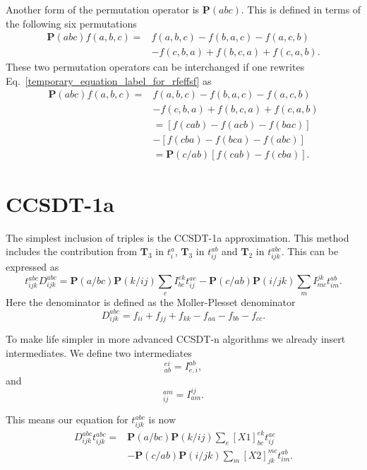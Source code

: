 Another form of the permutation operator is $\textbf{P}(abc)$. This is defined in terms of the following six permutations
\begin{align}
\textbf{P}(abc) f(a,b,c) = & f(a,b,c) - f(b,a,c) - f(a,c,b)  \nonumber \\ & - f(c,b,a) + f(b,c,a) + f(c,a,b) . \label{temporary_equation_label_for_rfeffsf}
\end{align}
These two permutation operators can be interchanged if one rewrites Eq.~\eqref{temporary_equation_label_for_rfeffsf} as
\begin{align}
\textbf{P}(abc) f(a,b,c) = & f(a,b,c) - f(b,a,c) - f(a,c,b)  \nonumber \\ & - f(c,b,a) + f(b,c,a) + f(c,a,b) \nonumber \\ &
= \left[ f(cab) - f(acb) - f(bac) \right] \nonumber \\ &
- \left[ f(cba) - f(bca) - f(abc) \right]
\nonumber \\ &
= \textbf{P}(c/ab) \left[ f(cab) - f(cba) \right] .
\end{align}

\section{CCSDT-1a}
The simplest inclusion of triples is the CCSDT-1a approximation. This
method includes the contribution from $\textbf{T}_3$ in $t_i^a$,
$\textbf{T}_3$ in $t_{ij}^{ab}$ and $\textbf{T}_2$ in
$t_{ijk}^{abc}$. This can be expressed as
\begin{equation}
t_{ijk}^{abc} D_{ijk}^{abc} = 
\textbf{P}(a/bc) \textbf{P}(k/ij) \sum_e I_{bc}^{ek} t_{ij}^{ae}
- \textbf{P}(c/ab) \textbf{P}(i/jk) \sum_m I_{mc}^{jk} t_{im}^{ab} .
\end{equation}
Here the denominator is defined as the Moller-Plesset denominator
\begin{equation}
D_{ijk}^{abc} = f_{ii} + f_{jj} + f_{kk} - f_{aa} - f_{bb} - f_{cc} .
\end{equation}

To make life simpler in more advanced CCSDT-n algorithms we already insert intermediates. We define two intermediates 
\begin{equation}
[X1]_{ab}^{ei} = I_{e,i}^{ab},
\end{equation}
and
\begin{equation}
[X2]_{ij}^{am} = I_{am}^{ij} .
\end{equation}

This means our equation for $t_{ijk}^{abc}$ is now
\begin{align}
D_{ijk}^{abc} t_{ijk}^{abc} = & \textbf{P}(a/bc) \textbf{P}(k/ij) \sum_e [X1]^{ek}_{bc} t_{ij}^{ae} \\ \nonumber &
- \textbf{P}(c/ab) \textbf{P}(i/jk) \sum_m [X2]_{jk}^{mc} t_{im}^{ab} .
\end{align}

